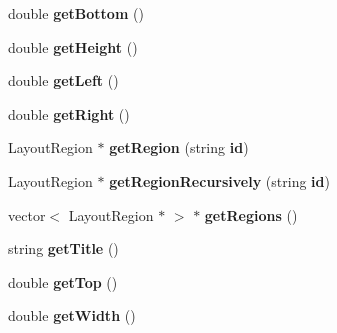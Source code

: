 \begin{CompactItemize}
\item 
double \textbf{getBottom} ()\label{classbr_1_1pucrio_1_1telemidia_1_1ginga_1_1ncl_1_1model_1_1presentation_1_1FormatterDeviceRegion_d95109f8495cbd9ad44507c46d96f745}

\item 
double \textbf{getHeight} ()\label{classbr_1_1pucrio_1_1telemidia_1_1ginga_1_1ncl_1_1model_1_1presentation_1_1FormatterDeviceRegion_e1d662c26106ff9692252346d578e8fa}

\item 
double \textbf{getLeft} ()\label{classbr_1_1pucrio_1_1telemidia_1_1ginga_1_1ncl_1_1model_1_1presentation_1_1FormatterDeviceRegion_6e887e31e2e5409655c4d0a810052cdc}

\item 
double \textbf{getRight} ()\label{classbr_1_1pucrio_1_1telemidia_1_1ginga_1_1ncl_1_1model_1_1presentation_1_1FormatterDeviceRegion_0faf6e56886f9328bc1bd9019b0f91f0}

\item 
LayoutRegion $\ast$ \textbf{getRegion} (string {\bf id})\label{classbr_1_1pucrio_1_1telemidia_1_1ginga_1_1ncl_1_1model_1_1presentation_1_1FormatterDeviceRegion_eb463b8c9773cca20ff7501e3935cd62}

\item 
LayoutRegion $\ast$ \textbf{getRegionRecursively} (string {\bf id})\label{classbr_1_1pucrio_1_1telemidia_1_1ginga_1_1ncl_1_1model_1_1presentation_1_1FormatterDeviceRegion_4ca6628add13c6fae9d3e14a110c3e99}

\item 
vector$<$ LayoutRegion $\ast$ $>$ $\ast$ \textbf{getRegions} ()\label{classbr_1_1pucrio_1_1telemidia_1_1ginga_1_1ncl_1_1model_1_1presentation_1_1FormatterDeviceRegion_1dfcbb86551e5628c5802f0c599aa13c}

\item 
string \textbf{getTitle} ()\label{classbr_1_1pucrio_1_1telemidia_1_1ginga_1_1ncl_1_1model_1_1presentation_1_1FormatterDeviceRegion_775e71d1ab52709b1058c1b3e32a2878}

\item 
double \textbf{getTop} ()\label{classbr_1_1pucrio_1_1telemidia_1_1ginga_1_1ncl_1_1model_1_1presentation_1_1FormatterDeviceRegion_c96f8afc7fee2cb03dffc5e3ad1b6e09}

\item 
double \textbf{getWidth} ()\label{classbr_1_1pucrio_1_1telemidia_1_1ginga_1_1ncl_1_1model_1_1presentation_1_1FormatterDeviceRegion_fa496ea0cb9690e3b30c8aa4626c331f}


\end{CompactItemize}
